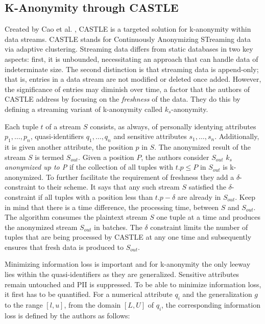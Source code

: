 \subsection{K-Anonymity through CASTLE\label{lit:castle}}
Created by Cao et al. \cite{Cao2008}, CASTLE is a targeted solution for k-anonymity within data streams. CASTLE stands for Continuously Anonymizing STreaming data via adaptive clustering. Streaming data differs from static databases in two key aspects: first, it is unbounded, necessitating an approach that can handle data of indeterminate size. The second distinction is that streaming data is append-only; that is, entries in a data stream are not modified or deleted once added. However, the significance of entries may diminish over time, a factor that the authors of CASTLE address by focusing on the \textit{freshness} of the data. They do this by defining a streaming variant of k-anonymity called $k_s$-anonymity.\par 
Each tuple $t$ of a stream $S$ consists, as always, of personally identying attributes $p_1, \dots, p_n$, quasi-identifiers $q_1, \dots, q_n$ and sensitive attributes $s_1,\dots, s_n$. Additionally, it is given another attribute, the position $p$ in $S$. The anonymized result of the stream $S$ is termed $S_{out}$. Given a position $P$, the authors consider $S_{out}$ \textit{$k_s$ anonymized up to P} if the collection of all tuples with $t.p \le P$ in $S_{out}$ is k-anonymized. To further facilitate the requirement of freshness they add a $\delta$-constraint to their scheme. It says that any such stream $S$ satisfied the $\delta$-constraint if all tuples with a position less than $t.p - \delta$ are already in $S_{out}$. Keep in mind that there is a time difference, the processing time, between $S$ and $S_{out}$. The algorithm consumes the plaintext stream $S$ one tuple at a time and produces the anonymized stream $S_{out}$ in batches. The $\delta$ constraint limits the number of tuples that are being processed by CASTLE at any one time and subsequently ensures that fresh data is produced to $S_{out}$. \par
Minimizing information loss is important and for k-anonymity the only leeway lies within the quasi-identifiers as they are generalized. Sensitive attributes remain untouched and \ac{PII} is suppressed. To be able to minimize information loss, it first has to be quantified. For a numerical attribute $q_i$ and the generalization $g$ to the range $[l,u]$, from the domain $[L, U]$ of $q_i$, the corresponding information loss is defined by the authors as follows: 

